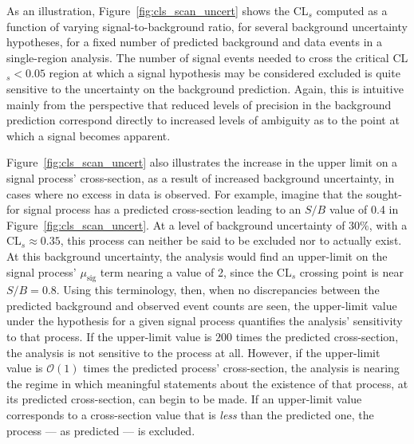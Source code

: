 As an illustration, Figure~\ref{fig:cls_scan_uncert} shows the CL$_s$ computed as a function of varying signal-to-background ratio, for several background uncertainty hypotheses,
for a fixed number of predicted background and data events in a single-region analysis.
The number of signal events needed to cross the critical CL$_s <0.05$ region
at which a signal hypothesis may be considered excluded is quite sensitive to the uncertainty
on the background prediction.
Again, this is intuitive mainly from the perspective that reduced levels of precision
in the background prediction correspond directly to increased levels of ambiguity 
as to the point at which a signal becomes apparent.

Figure~\ref{fig:cls_scan_uncert} also illustrates the increase in the upper limit
on a signal process' cross-section, as a result of increased background uncertainty,
in cases where no excess in data is observed.
For example, imagine that the sought-for signal process has a predicted cross-section leading to an
$S/B$ value of 0.4 in Figure~\ref{fig:cls_scan_uncert}.
At a level of background uncertainty of $30\%$, with a CL$_s \approx 0.35$, this process can neither be said
to be excluded nor to actually exist.
At this background uncertainty, the analysis would find an upper-limit on the signal process' $\mu_{\text{sig}}$ term nearing a value of 2,
since the CL$_s$ crossing point is near $S/B = 0.8$.
Using this terminology, then, when no discrepancies between the predicted background and observed event counts
are seen, the upper-limit value under the hypothesis for a
given signal process
quantifies the analysis'
sensitivity to that process.
If the upper-limit value is $200$ times the predicted cross-section, the analysis is not sensitive to the process at all.
However, if the upper-limit value is $\mathcal{O}(1)$ times the predicted process' cross-section, the analysis
is nearing the regime in which meaningful statements about the existence of that process, at its predicted cross-section, can begin to be made.
If an upper-limit value corresponds to a cross-section value that is \textit{less} than the predicted one,
the process --- as predicted --- is excluded.

